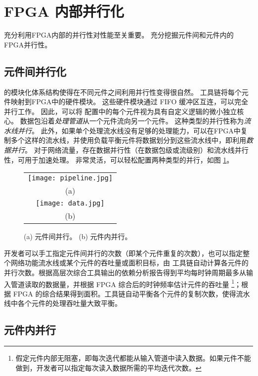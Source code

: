 \section{FPGA 内部并行化}
\label{clicknp:sec:optimization}

充分利用FPGA内部的并行性对性能至关重要。
\name 充分挖掘元件间和元件内的FPGA并行性。

\subsection{元件间并行化}
\name 的模块化体系结构使得在不同元件之间利用并行性变得很自然。
\name 工具链将每个元件映射到FPGA中的硬件模块。
这些硬件模块通过 FIFO 缓冲区互连，可以完全并行工作。 
因此，可以将 \name 配置中的每个元件视为具有自定义逻辑的微小独立核心。
数据包沿着\textit {处理管道}从一个元件流向另一个元件。
这种类型的并行性称为\textit {流水线并行}。
此外，如果单个处理流水线没有足够的处理能力，可以在FPGA中复制多个这样的流水线，并使用负载平衡元件将数据划分到这些流水线中，即利用\textit{数据并行}。
对于网络流量，存在数据并行性（在数据包级或流级别）和流水线并行性，可用于加速处理。
\name 非常灵活，可以轻松配置两种类型的并行，如图 \ref{clicknp:fig:element-para}。

\begin{figure}
\centering
\begin{tabular}{c}
\texttt{[image: pipeline.jpg]}\\
(a)\\
\texttt{[image: data.jpg]}\\
(b)\\
\end{tabular}
\caption{(a) 元件间并行。 (b) 元件内并行。}
\label{clicknp:fig:element-para}
\end{figure}

开发者可以手工指定元件间并行的次数（即某个元件重复的次数），也可以指定整个网络功能流水线或某个元件的吞吐量或面积目标，由 \name 工具链自动计算各元件的并行次数。\name 根据高层次综合工具输出的依赖分析报告得到平均每时钟周期最多从输入管道读取的数据量，并根据 FPGA 综合后的时钟频率估计元件的吞吐量 \footnote{假定元件内部无阻塞，即每次迭代都能从输入管道中读入数据。如果元件不能做到，开发者可以指定每次读入数据所需的平均迭代次数。}；根据 FPGA 的综合结果得到面积。\name 工具链自动平衡各个元件的复制次数，使得流水线中各个元件的处理吞吐量大致平衡。

\subsection{元件内并行}
\label{clicknp:subsec:paral_in_elem}

